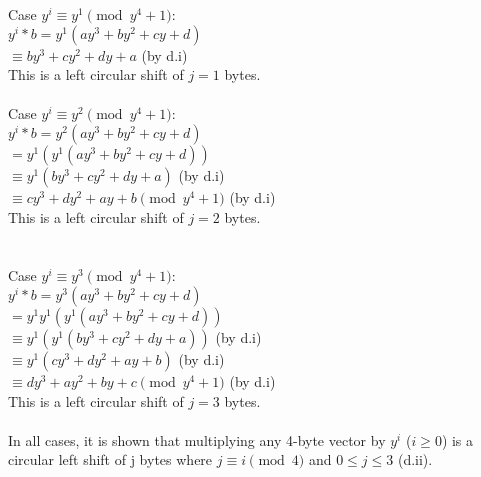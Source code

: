 \documentclass{assignment}
\newcommand\tab[1][0.5cm]{\hspace*{#1}}
\begin{document}
\begin{problemlist}
\begin{problem}
\begin{answer}
Case $y^i\equiv y^1 \pmod {y^4+1}$: \\
\tab$y^i*b=y^1(ay^3+by^2+cy+d)$\\
\tab$\equiv by^3+cy^2+dy+a$  \tab (by d.i)\\
\tab This is a left circular shift of $j=1$ bytes.\\
\\
Case $y^i\equiv y^2 \pmod {y^4+1}$: \\
\tab$y^i*b=y^2(ay^3+by^2+cy+d)$\\
\tab$=y^1(y^1(ay^3+by^2+cy+d))$  \\
\tab$\equiv y^1(by^3+cy^2+dy+a)$ \tab (by d.i)\\
\tab$\equiv cy^3+dy^2+ay+b \pmod {y^4+1}$ (by d.i) \\
\tab This is a left circular shift of $j=2$ bytes.\\
\\
\\
Case $y^i\equiv y^3 \pmod {y^4+1}$: \\
\tab$y^i*b=y^3(ay^3+by^2+cy+d)$\\
\tab$=y^1y^1(y^1(ay^3+by^2+cy+d))$  \\
\tab$\equiv y^1(y^1(by^3+cy^2+dy+a))$ \tab (by d.i)\\
\tab$\equiv y^1(cy^3+dy^2+ay+b) $ \tab\tab (by d.i)\\
\tab$\equiv dy^3+ay^2+by+c \pmod {y^4+1}$  (by d.i)\\
\tab This is a left circular shift of $j=3$ bytes.\\
\\
In all cases, it is shown that multiplying any 4-byte vector by $y^i$ ($i\geq 0$) is a circular left shift of j bytes where $j\equiv i \pmod 4$ and $0\leq j \leq 3$ (d.ii).\\
\\
\end{answer}
\end{problem}


\end{problemlist}
\end{document}
